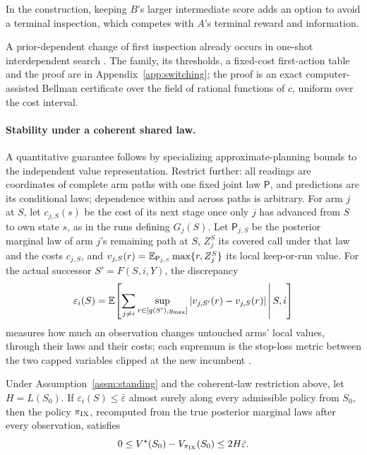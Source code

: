 In the construction, keeping $B$'s larger intermediate score adds an option to avoid a terminal
inspection, which competes with $A$'s terminal reward and information.

A prior-dependent change of first inspection already occurs in
one-shot interdependent search \citep[Example~1]{bao2026interdependent}. The family,
its thresholds, a fixed-cost first-action table and the proof are in
Appendix~\ref{app:switching}; the proof is an exact
computer-assisted Bellman certificate over the field of rational functions of $c$, uniform
over the cost interval.

\paragraph{Stability under a coherent shared law.}
A quantitative guarantee follows by specializing approximate-planning bounds
\citep[Theorem~9 and Remark~11]{subramanian2022ais} to the independent value representation.
Restrict further: all readings are coordinates of complete arm paths with one fixed joint law
$\mathsf P$, and predictions are its conditional laws; dependence within and across paths is
arbitrary. For arm $j$ at $S$, let $c_{j,S}(s)$ be the cost of its next stage once only $j$ has
advanced from $S$ to own state $s$, as in the runs defining $G_j(S)$. Let $\mathsf P_{j,S}$ be
the posterior marginal law of arm $j$'s remaining path at $S$, $Z_j^S$ its covered call under
that law and the costs $c_{j,S}$, and $v_{j,S}(r)=\mathbb{E}_{\mathsf P_{j,S}}\max\{r,Z_j^S\}$ its local
keep-or-run value. For the actual
successor $S'=F(S,i,Y)$, the discrepancy
\[
 \varepsilon_i(S)=\mathbb{E}\!\left[
   \sum_{j\ne i}\sup_{r\in[q(S'),y_{\max}]}
       |v_{j,S'}(r)-v_{j,S}(r)|\,\middle|\,S,i\right]
\]
measures how much an observation changes untouched arms' local values, through their laws
and their costs; each supremum is the
stop-loss metric between the two capped variables clipped at the new incumbent
\citep[Section~5, Example~C]{muller1997ipm}.

\begin{proposition}\label{prop:sharing-robustness}
Under Assumption~\ref{assm:standing} and the coherent-law restriction above, let $H=L(S_0)$. If $\varepsilon_i(S)\le\bar\varepsilon$ almost surely
along every admissible policy from $S_0$, then the policy $\pi_{\rm IX}$,
recomputed from the true posterior marginal laws after every observation, satisfies
\[
 0\le V^\star(S_0)-V_{\pi_{\rm IX}}(S_0)\le 2H\bar\varepsilon.
\]
\end{proposition}

